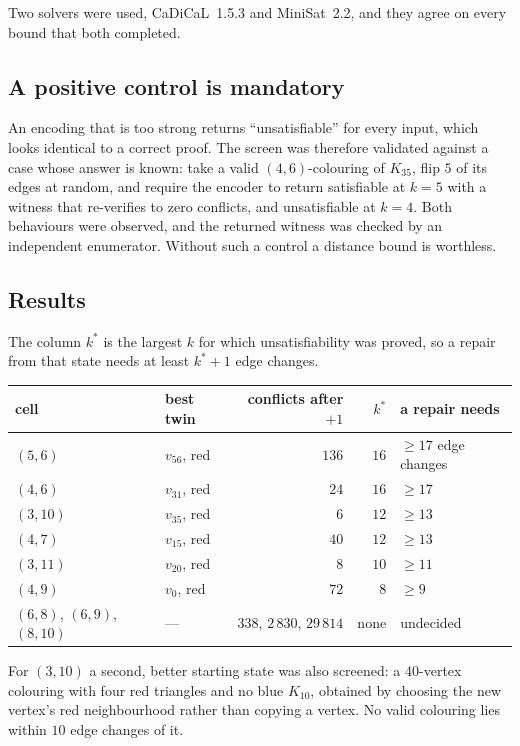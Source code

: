 Two solvers were used, CaDiCaL~1.5.3 and MiniSat~2.2, and they agree on every bound that both
completed.

\subsection*{A positive control is mandatory}

An encoding that is too strong returns ``unsatisfiable'' for every input, which looks identical to a
correct proof. The screen was therefore validated against a case whose answer is known: take a valid
$(4,6)$-colouring of $K_{35}$, flip $5$ of its edges at random, and require the encoder to return
satisfiable at $k=5$ with a witness that re-verifies to zero conflicts, and unsatisfiable at $k=4$.
Both behaviours were observed, and the returned witness was checked by an independent enumerator.
Without such a control a distance bound is worthless.

\subsection*{Results}

The column $k^\ast$ is the largest $k$ for which unsatisfiability was proved, so a repair from that
state needs at least $k^\ast+1$ edge changes.

\begin{center}
\small
\begin{tabular}{@{}llrrl@{}}
\toprule
cell & best twin & conflicts after $+1$ & $k^\ast$ & a repair needs\\
\midrule
$(5,6)$ & $v_{56}$, red & $136$ & $16$ & $\ge 17$ edge changes\\
$(4,6)$ & $v_{31}$, red & $24$ & $16$ & $\ge 17$\\
$(3,10)$ & $v_{35}$, red & $6$ & $12$ & $\ge 13$\\
$(4,7)$ & $v_{15}$, red & $40$ & $12$ & $\ge 13$\\
$(3,11)$ & $v_{20}$, red & $8$ & $10$ & $\ge 11$\\
$(4,9)$ & $v_{0}$, red & $72$ & $8$ & $\ge 9$\\
\midrule
$(6,8)$, $(6,9)$, $(8,10)$ & --- & $338$, $2\,830$, $29\,814$ & none & undecided\\
\bottomrule
\end{tabular}
\end{center}

For $(3,10)$ a second, better starting state was also screened: a $40$-vertex colouring with four red
triangles and no blue $K_{10}$, obtained by choosing the new vertex's red neighbourhood rather than
copying a vertex. No valid colouring lies within $10$ edge changes of it.


